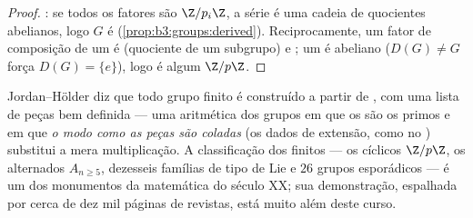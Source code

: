 \begin{proof}
: se todos os fatores são $\Z/p_i\Z$, a série é uma cadeia de
quocientes abelianos, logo $G$ é  (\cref{prop:b3:groups:derived}).
Reciprocamente, um fator de composição de um  é 
(quociente de um subgrupo) e ; um   é
abeliano ($D(G) \ne G$ força $D(G) = \{e\}$), logo é algum $\Z/p\Z$.
\end{proof}

\begin{remark}\label{rem:b3:groups:jhmeaning}
Jordan--Hölder diz que todo grupo finito é construído a partir de
, com uma lista de peças bem definida --- uma aritmética
dos grupos em que os  são os primos e em que \emph{o modo
como as peças são coladas} (os dados de extensão, como no ) substitui a mera multiplicação. A classificação dos  finitos --- os cíclicos $\Z/p\Z$, os alternados $A_{n \geq
5}$,
dezesseis famílias de tipo de Lie e $26$ grupos esporádicos --- é
um dos monumentos da matemática do século XX; sua demonstração,
espalhada por cerca de dez mil páginas de revistas, está muito além
deste curso.
\end{remark}

